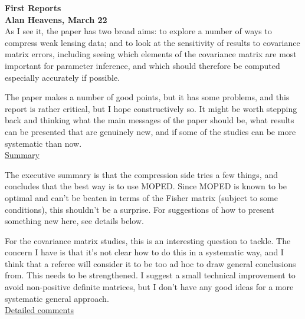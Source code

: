 \documentclass{article}
\begin{document}
    \pagebreak

    {\Large\textbf{First Reports}}\\
	
	\textbf{Alan Heavens, March 22} \\
	
	As I see it, the paper has two broad aims: to explore a number of ways to compress weak lensing data; and to look at the sensitivity of results to covariance matrix errors, including seeing which elements of the covariance matrix are most important for parameter inference, and which should therefore be computed especially accurately if possible.
	
	The paper makes a number of good points, but it has some problems, and this report is rather critical, but I hope constructively so.  It might be worth stepping back and thinking what the main messages of the paper should be, what results can be presented that are genuinely new, and if some of the studies can be more systematic than now.  \\
	
	\underline{Summary}
	
    The executive summary is that the compression side tries a few things, and concludes that the best way is to use MOPED.  Since MOPED is known to be optimal and can’t be beaten in terms of the Fisher matrix (subject to some conditions), this shouldn’t be a surprise.  For suggestions of how to present something new here, see details below.
	
	For the covariance matrix studies, this is an interesting question to tackle.  The concern I have is that it’s not clear how to do this in a systematic way, and I think that a referee will consider it to be too ad hoc to draw general conclusions from.  This needs to be strengthened.  I suggest a small technical improvement to avoid non-positive definite matrices, but I don’t have any good ideas for a more systematic general approach. \\
	
	\underline{Detailed comments}
	
\end{document}
